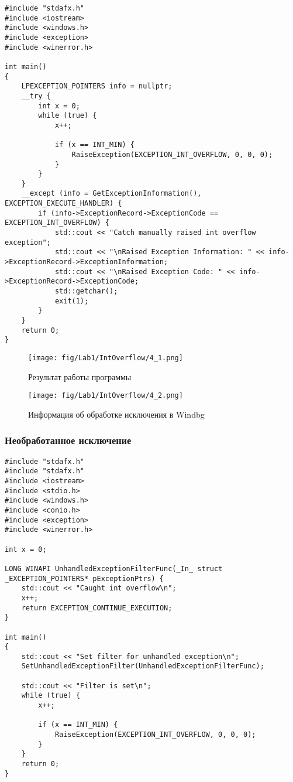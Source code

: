 \begin{lstlisting}[caption=Ручная генерация исключения и информация об ошибке]
#include "stdafx.h"
#include <iostream>
#include <windows.h>
#include <exception>
#include <winerror.h>

int main()
{
    LPEXCEPTION_POINTERS info = nullptr;
    __try {
        int x = 0;
        while (true) {
            x++;

            if (x == INT_MIN) {
                RaiseException(EXCEPTION_INT_OVERFLOW, 0, 0, 0);
            }
        }
    }
    __except (info = GetExceptionInformation(), EXCEPTION_EXECUTE_HANDLER) {
        if (info->ExceptionRecord->ExceptionCode == EXCEPTION_INT_OVERFLOW) {
            std::cout << "Catch manually raised int overflow exception";
            std::cout << "\nRaised Exception Information: " << info->ExceptionRecord->ExceptionInformation;
            std::cout << "\nRaised Exception Code: " << info->ExceptionRecord->ExceptionCode;
            std::getchar();
            exit(1);
        }
    }
    return 0;
}
\end{lstlisting}

\begin{figure}[H]
    \begin{center}
        \texttt{[image: fig/Lab1/IntOverflow/4\_1.png]}
        \caption{Результат работы программы}
        \label{pic:4_1}
    \end{center}
\end{figure}

\begin{figure}[H]
    \begin{center}
        \texttt{[image: fig/Lab1/IntOverflow/4\_2.png]}
        \caption{Информация об обработке исключения в Windbg}
        \label{pic:4_2}
    \end{center}
\end{figure}

\subsubsection{Необработанное исключение}
\begin{lstlisting}[caption=Необработанное исключение]
#include "stdafx.h"
#include "stdafx.h"
#include <iostream>
#include <stdio.h>
#include <windows.h>
#include <conio.h>
#include <exception>
#include <winerror.h>

int x = 0;

LONG WINAPI UnhandledExceptionFilterFunc(_In_ struct _EXCEPTION_POINTERS* pExceptionPtrs) {
    std::cout << "Caught int overflow\n";
    x++;
    return EXCEPTION_CONTINUE_EXECUTION;
}

int main()
{
    std::cout << "Set filter for unhandled exception\n";
    SetUnhandledExceptionFilter(UnhandledExceptionFilterFunc);

    std::cout << "Filter is set\n";
    while (true) {
        x++;

        if (x == INT_MIN) {
            RaiseException(EXCEPTION_INT_OVERFLOW, 0, 0, 0);
        }
    }
    return 0;
}
\end{lstlisting}

